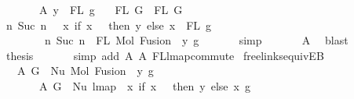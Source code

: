 \begin{isabellebody}
\ \ \ \ \ \ \ A{}{\isacharcolon}{\kern0pt}\ {\isachardoublequoteopen}y\ {\isasymin}\ FL\ g{\isachardoublequoteclose}\isanewline
\ \ \ {\isachardoublequoteopen}FL\ G{}\ {\isacharequal}{\kern0pt}\ FL\ G{}{\isachardoublequoteclose}\isanewline
%
\isadelimproof
%
\endisadelimproof
%
\isatagproof
{}\isamarkupfalse%
\ {\isacharminus}{\kern0pt}\isanewline
\ \ \isamarkupfalse%
\ {\isachardoublequoteopen}{\isacharbraceleft}{\kern0pt}n{\isachardot}{\kern0pt}\ Suc\ n\ {\isasymin}\ {\isacharparenleft}{\kern0pt}{\isasymlambda}\ x{\isachardot}{\kern0pt}\ if\ x\ {\isacharequal}{\kern0pt}\ {}\ then\ y\ else\ x{\isacharparenright}{\kern0pt}\ {\isacharbackquote}{\kern0pt}\ FL\ g{\isacharbraceright}{\kern0pt}\ {\isacharequal}{\kern0pt}\isanewline
\ \ \ \ \ \ \ \ {\isacharbraceleft}{\kern0pt}n{\isachardot}{\kern0pt}\ Suc\ n\ {\isasymin}\ FL\ {\isacharparenleft}{\kern0pt}Mol\ {\isacharparenleft}{\kern0pt}Fusion\ {}\ y{\isacharparenright}{\kern0pt}\ g{\isacharparenright}{\kern0pt}{\isacharbraceright}{\kern0pt}{\isachardoublequoteclose}\isanewline
\ \ \ \ \ \isamarkupfalse%
\ simp\isanewline
\ \ \ \ \ \isamarkupfalse%
\ A{}\ \isamarkupfalse%
\ blast\isanewline
\ \ \isamarkupfalse%
\ \isamarkupfalse%
\ {\isacharquery}{\kern0pt}thesis\isanewline
\ \ \ \ \ \isamarkupfalse%
\ {\isacharparenleft}{\kern0pt}simp\ add{\isacharcolon}{\kern0pt}\ A{}\ A{}\ FL{\isacharunderscore}{\kern0pt}lmap{\isacharunderscore}{\kern0pt}commute{\isacharparenright}{\kern0pt}\isanewline
{}\isamarkupfalse%
%
\endisatagproof
{\isafoldproof}%
%
\isadelimproof
\isanewline
%
\endisadelimproof
\isanewline
\isanewline
{}\isamarkupfalse%
\ freelinks{\isacharunderscore}{\kern0pt}equiv{\isacharunderscore}{\kern0pt}E{}B{\isacharcolon}{\kern0pt}\isanewline
\ \ \ A{}{\isacharcolon}{\kern0pt}\ {\isachardoublequoteopen}G{}\ {\isacharequal}{\kern0pt}\ Nu\ {\isacharparenleft}{\kern0pt}Mol\ {\isacharparenleft}{\kern0pt}Fusion\ {}\ y{\isacharparenright}{\kern0pt}\ g{\isacharparenright}{\kern0pt}{\isachardoublequoteclose}\isanewline
\ \ \ \ \ \ \ A{}{\isacharcolon}{\kern0pt}\ {\isachardoublequoteopen}G{}\ {\isacharequal}{\kern0pt}\ Nu\ {\isacharparenleft}{\kern0pt}lmap\ {\isacharparenleft}{\kern0pt}{\isasymlambda}\ x{\isachardot}{\kern0pt}\ if\ x\ {\isacharequal}{\kern0pt}\ {}\ then\ y\ else\ x{\isacharparenright}{\kern0pt}\ g{\isacharparenright}{\kern0pt}{\isachardoublequoteclose}\isanewline

\end{isabellebody}
